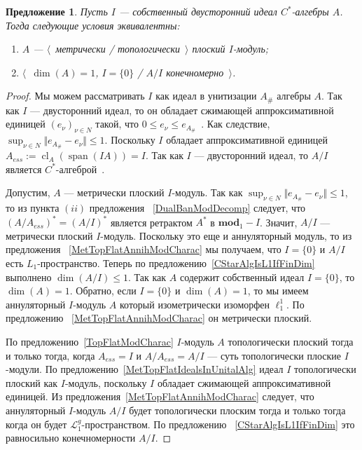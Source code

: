 \documentclass[12pt]{article}
\newtheorem{proposition}[theorem]{Предложение}
\begin{document}
\begin{proposition}\label{CStarAlgIsTopFlatOverItsIdeal} Пусть $I$ ---
собственный двусторонний идеал $C^*$-алгебры $A$. Тогда следующие условия
эквивалентны:
\begin{enumerate}[label = (\roman*)]
\item $A$ --- $\langle$~метрически / топологически~$\rangle$ плоский $I$-модуль;
\item $\langle$~$\operatorname{dim}(A)=1$, $I= \{0 \}$ / $A/I$
конечномерно~$\rangle$.
\end{enumerate}
\end{proposition}
\begin{proof} Мы можем рассматривать $I$ как идеал в унитизации $A_\#$ алгебры
$A$. Так как $I$ --- двусторонний идеал, то он обладает сжимающей
аппроксимативной единицей ${(e_\nu)}_{\nu\in N}$ такой, что $0\leq e_\nu\leq
e_{A_\#}$~\cite[предложение 4.7.79]{HelBanLocConvAlg}. Как следствие,
$\sup_{\nu\in N}\Vert e_{A_\#}-e_\nu\Vert\leq 1$. Поскольку $I$ обладает
аппроксимативной единицей
$A_{ess}:=\operatorname{cl}_A(\operatorname{span}(IA))=I$. Так как $I$ ---
двусторонний идеал, то $A/I$ является $C^*$-алгеброй~\cite[теорема
4.7.81]{HelBanLocConvAlg}.

Допустим, $A$ --- метрически плоский $I$-модуль. Так как $\sup_{\nu\in N}\Vert
e_{A_\#}-e_\nu\Vert\leq 1$, то из пункта $(ii)$ предложения
~\ref{DualBanModDecomp} следует, что ${(A/A_{ess})}^*={(A/I)}^*$ является
ретрактом $A^*$ в $\mathbf{mod}_1-I$. Значит, $A/I$ --- метрически плоский
$I$-модуль. Поскольку это еще и аннуляторный модуль, то из предложения
~\ref{MetTopFlatAnnihModCharac} мы получаем, что $I= \{0 \}$ и $A/I$ есть
$L_1$-пространство. Теперь по предложению~\ref{CStarAlgIsL1IfFinDim} выполнено
$\operatorname{dim}(A/I)\leq 1$. Так как $A$ содержит собственный идеал $I= \{0
\}$, то $\operatorname{dim}(A)=1$. Обратно, если $I= \{0 \}$ и
$\operatorname{dim}(A)=1$, то мы имеем аннуляторный $I$-модуль $A$ который
изометрически изоморфен $\ell_1^1$. По предложению
~\ref{MetTopFlatAnnihModCharac} он метрически плоский. 

По предложению~\ref{TopFlatModCharac} $I$-модуль $A$ топологически плоский тогда
и только тогда, когда $A_{ess}=I$ и $A/A_{ess}=A/I$ --- суть топологически
плоские $I$-модули. По предложению~\ref{MetTopFlatIdealsInUnitalAlg} идеал $I$
топологически плоский как $I$-модуль, поскольку $I$ обладает сжимающей
аппроксимативной единицей. Из предложения~\ref{MetTopFlatAnnihModCharac}
следует, что аннуляторный $I$-модуль $A/I$ будет топологически плоским тогда и
только тогда когда он будет $\mathcal{L}_1^g$-пространством. По предложению
~\ref{CStarAlgIsL1IfFinDim} это равносильно конечномерности $A/I$.
\end{proof}
\end{document}
